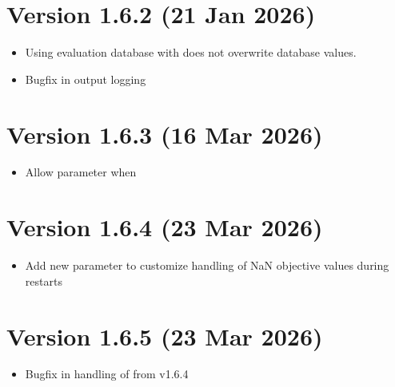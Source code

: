 \documentclass[letterpaper,10pt,english]{sphinxmanual}
\begin{document}
\section{Version 1.6.2 (21 Jan 2026)}
\label{\detokenize{history:version-1-6-2-21-jan-2026}}\begin{itemize}
\item {} 
\sphinxAtStartPar
Using evaluation database with  does not overwrite database values.

\item {} 
\sphinxAtStartPar
Bugfix in output logging

\end{itemize}


\section{Version 1.6.3 (16 Mar 2026)}
\label{\detokenize{history:version-1-6-3-16-mar-2026}}\begin{itemize}
\item {} 
\sphinxAtStartPar
Allow parameter  when 

\end{itemize}


\section{Version 1.6.4 (23 Mar 2026)}
\label{\detokenize{history:version-1-6-4-23-mar-2026}}\begin{itemize}
\item {} 
\sphinxAtStartPar
Add new parameter  to customize handling of NaN objective values during restarts

\end{itemize}


\section{Version 1.6.5 (23 Mar 2026)}
\label{\detokenize{history:version-1-6-5-23-mar-2026}}\begin{itemize}
\item {} 
\sphinxAtStartPar
Bugfix in handling of  from v1.6.4

\end{itemize}
\end{document}
